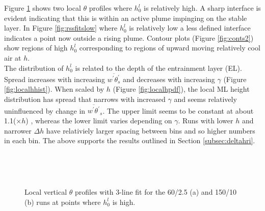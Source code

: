 Figure \ref{fig:rssfitshigh} shows two local $\theta$ profiles where $h_{0}^{l}$ is relatively high.  
A sharp interface is evident indicating that this is within an active plume impinging on the stable layer.
In Figure \ref{fig:rssfitslow} where $h_{0}^{l}$ is relatively low a less defined interface indicates 
a point now outside a rising plume.  Contour plots (Figure \ref{fig:conts2}) show regions of high 
$h_{0}^{l}$ corresponding to regions of upward moving relatively cool air at $h$.\\

The distribution of $h_{0}^{l}$ is related to the depth of the entrainment layer (\acs{EL}).
Spread increases with increasing $\overline{w^{'}\theta^{'}_{s}}$ and decreases with increasing $\gamma$
(Figure \ref{fig:localhhist}).  When scaled by $h$  (Figure \ref{fig:localhpdf}), the local \acs{ML} height distribution 
has spread that narrows with increased $\gamma$ and seems relatively uninfluenced by change in $\overline{w^{'}\theta^{'}}_{s}$.  
The upper limit seems to be constant at about 1.1($\times h$) , whereas the lower limit varies 
depending on $\gamma$.   Runs with lower $h$ and narrower $\Delta h$ have relativiely 
larger spacing between bins and so higher numbers in each bin.  The above supports the results outlined in
Section \ref{subsec:deltahri}.\\


\begin{figure}[htbp]
\begin{minipage}[b]{0.5\linewidth}
        \\
        \end{minipage}             
\quad
\begin{minipage}[b]{0.5\linewidth}
        \\
       
       \end{minipage}
        \caption{Local vertical $\theta$ profiles with 3-line fit for the 60/2.5 (a) and 150/10 (b) runs at 
points where $h^{l}_{0}$ is high.}
        \label{fig:rssfitshigh}
\end{figure}

